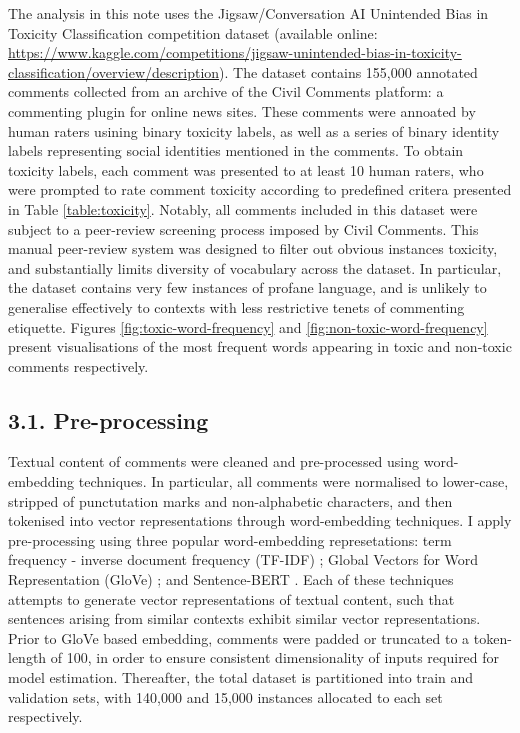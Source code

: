 
The analysis in this note uses the Jigsaw/Conversation AI Unintended Bias in Toxicity Classification competition dataset (available online: \url{https://www.kaggle.com/competitions/jigsaw-unintended-bias-in-toxicity-classification/overview/description}). The dataset contains 155,000 annotated comments collected from an archive of the Civil Comments platform: a commenting plugin for online news sites. 
These comments were annoated by human raters usining binary toxicity labels, as well as a series of binary identity labels representing social identities mentioned in the comments. 
To obtain toxicity labels, each comment was presented to at least 10 human raters, who were prompted to rate comment toxicity according to predefined critera presented in Table \ref{table:toxicity}. 
Notably, all comments included in this dataset were subject to a peer-review screening process imposed by Civil Comments. 
This manual peer-review system was designed to filter out obvious instances toxicity, and substantially limits diversity of vocabulary across the dataset. 
In particular, the dataset contains very few instances of profane language, and is unlikely to generalise effectively to contexts with less restrictive tenets of commenting etiquette.
Figures \ref{fig:toxic-word-frequency} and \ref{fig:non-toxic-word-frequency} present visualisations of the most frequent words appearing in toxic and non-toxic comments respectively. 

\subsection*{3.1. Pre-processing}

Textual content of comments were cleaned and pre-processed using word-embedding techniques. In particular, all comments were normalised to lower-case, stripped of punctutation marks and non-alphabetic characters, and then tokenised into vector representations through word-embedding techniques. I apply pre-processing using three popular word-embedding represetations: term frequency - inverse document frequency (TF-IDF) \cite{luhn1957statistical,jones1972statistical}; Global Vectors for Word Representation (GloVe) \cite{pennington2014glove}; and Sentence-BERT \cite{reimers2019sentence}. Each of these techniques attempts to generate vector representations of textual content, such that sentences arising from similar contexts exhibit similar vector representations. Prior to GloVe based embedding, comments were padded or truncated to a token-length of 100, in order to ensure consistent dimensionality of inputs required for model estimation. Thereafter, the total dataset is partitioned into train and validation sets, with 140,000 and 15,000 instances allocated to each set respectively. 


